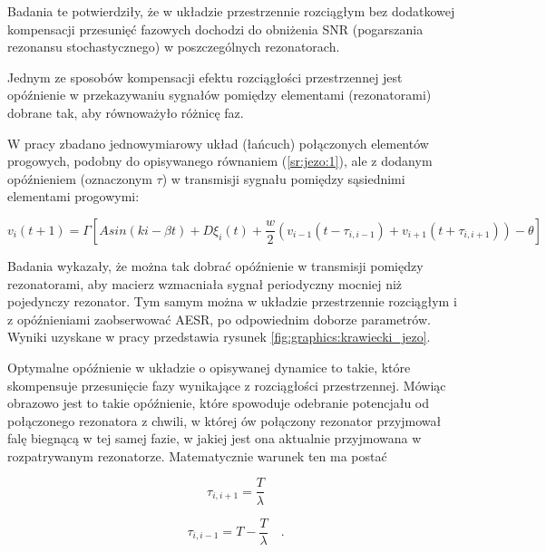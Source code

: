   Badania te potwierdziły, że w układzie przestrzennie rozciągłym bez dodatkowej kompensacji przesunięć fazowych dochodzi do obniżenia SNR (pogarszania rezonansu stochastycznego) w poszczególnych rezonatorach.

  Jednym ze sposobów kompensacji efektu rozciągłości przestrzennej jest opóźnienie w przekazywaniu sygnałów pomiędzy elementami (rezonatorami) dobrane tak, aby równoważyło różnicę faz. 

  W pracy \cite{ijmpb_23_2} zbadano jednowymiarowy układ (łańcuch) połączonych elementów progowych, podobny do opisywanego równaniem (\ref{sr:jezo:1}), ale z dodanym opóźnieniem (oznaczonym $\tau$) w transmisji sygnału pomiędzy sąsiednimi elementami progowymi:

  \begin{equation} \label{sr:jezo:2}
    v_i (t+1) = \Gamma [A sin (ki - \beta t) + D \xi_i (t) + \frac{w}{2}(v_{i-1}(t-\tau_{i,i-1}) + v_{i+1}(t+\tau_{i,i+1})) - \theta]
  \end{equation}

  Badania wykazały, że można tak dobrać opóźnienie w transmisji pomiędzy rezonatorami, aby macierz wzmacniała sygnał periodyczny mocniej niż pojedynczy rezonator. Tym samym można w układzie przestrzennie rozciągłym i z opóźnieniami zaobserwować AESR, po odpowiednim doborze parametrów. Wyniki uzyskane w pracy \cite{ijmpb_23_2} przedstawia rysunek \ref{fig:graphics:krawiecki_jezo}.

  Optymalne opóźnienie w układzie o opisywanej dynamice to takie, które skompensuje przesunięcie fazy wynikające z rozciągłości przestrzennej. Mówiąc obrazowo jest to takie opóźnienie, które spowoduje odebranie potencjału od połączonego rezonatora z chwili, w której ów połączony rezonator przyjmował falę biegnącą w tej samej fazie, w jakiej jest ona aktualnie przyjmowana w rozpatrywanym rezonatorze. Matematycznie warunek ten ma postać

  \begin{equation} \label{sr:jezo:3a}
    \tau_{i,i+1} = \frac{T}{\lambda}
  \end{equation}

  \begin{equation} \label{sr:jezo:3b}
    \tau_{i,i-1} = T - \frac{T}{\lambda} \quad .
  \end{equation}

